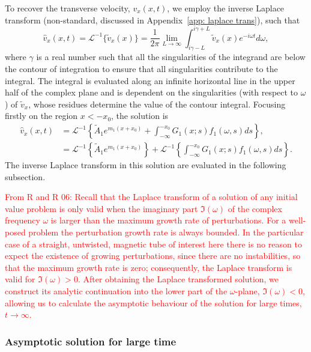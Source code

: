 \documentclass[12pt]{../style-files/ociamthesis}
\begin{document}
To recover the transverse velocity, $v_x(x, t)$, we employ the inverse Laplace transform (non-standard, discussed in Appendix~\ref{app: laplace trans}), such that
\begin{equation}
\hat{v}_x(x,t) = \mathcal{L}^{-1}\{\tilde{v}_x(x)\} = \frac{1}{2\pi} \lim_{L \to \infty} \int_{i\gamma - L}^{i\gamma + L} \tilde{v}_x(x) e^{-i\omega t} d\omega,
\label{laplace transform}
\end{equation}
where $\gamma$ is a real number such that all the singularities of the integrand are below the contour of integration to ensure that all singularities contribute to the integral. The integral is evaluated along an infinite horizontal line in the upper half of the complex plane and is dependent on the singularities (with respect to $\omega$) of $\tilde{v}_x$, whose residues determine the value of the contour integral. Focusing firstly on the region $x < -x_0$, the solution is
\begin{align}
\hat{v}_x(x, t) &= \mathcal{L}^{-1} \left\{ \tilde{A}_1 e^{m_1(x + x_0)} + \int_{-\infty}^{-x_0} G_1(x; s)f_1(\omega, s)ds \right\}, \\
&= \mathcal{L}^{-1} \left\{ \tilde{A}_1 e^{m_1(x + x_0)} \right\} + \mathcal{L}^{-1} \left\{ \int_{-\infty}^{-x_0} G_1(x; s)f_1(\omega, s)ds \right\}.
\end{align}
The inverse Laplace transform in this solution are evaluated in the following subsection. 

\textcolor{red}{ From R and R 06: Recall that the Laplace transform of a solution of any initial value problem is only valid when the imaginary part $\Im(\omega)$ of the complex frequency $\omega$ is larger than the maximum growth rate of perturbations. For a well-posed problem the perturbation growth rate is always bounded. In the particular case of a straight, untwisted, magnetic tube of interest here there is no reason to expect the existence of growing perturbations, since there are no instabilities, so that the maximum growth rate is zero; consequently, the Laplace transform is valid for $\Im(\omega) > 0$. After obtaining the Laplace transformed solution, we construct its analytic continuation into the lower part of the $\omega$-plane, $\Im(\omega) < 0$, allowing us to calculate the asymptotic behaviour of the solution for large times, $t \to \infty$.}

\color{red}
\subsubsection{Asymptotic solution for large time}
\end{document}
